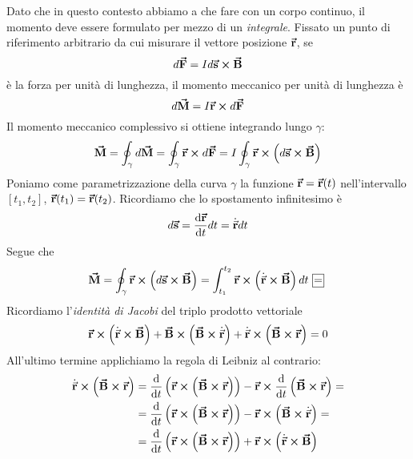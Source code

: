 \begin{demonstration}
	Dato che in questo contesto abbiamo a che fare con un corpo continuo, il momento deve essere formulato per mezzo di un \textit{integrale}. Fissato un punto di riferimento arbitrario da cui misurare il vettore posizione $\vb*{\va{r}}$, se
	\begin{equation*}
		d\vb*{\va{F}}=Id\vb*{\va{s}}\cross \vb*{\va{B}}
	\end{equation*}
	è la forza per unità di lunghezza, il momento meccanico per unità di lunghezza è
	\begin{equation*}
		d\vb*{\va{M}}=I\vb*{\va{r}}\cross d\vb*{\va{F}}
	\end{equation*}
	Il momento meccanico complessivo si ottiene integrando lungo $\gamma$:
	\begin{equation*}
		\vb*{\va{M}}=\oint_\gamma d\vb*{\va{M}}=\oint_\gamma \vb*{\va{r}}\cross d\vb*{\va{F}}=I \oint_\gamma \vb*{\va{r}}\cross\left(d\vb*{\va{s}}\cross\vb*{\va{B}}\right)
	\end{equation*}
		Poniamo come parametrizzazione della curva $\gamma$ la funzione $\vb*{\va{r}}=\vb*{\va{r}}(t)$ nell'intervallo $\left[t_1, t_2\right]$, $\vb*{\va{r}}(t_1)=\vb*{\va{r}}(t_2)$. Ricordiamo che lo spostamento infinitesimo è
	\begin{equation*}
		d\vb*{\va{s}}=\dv{\vb*{\va{r}}}{t}dt=\dot{\vec{\mathbf{r}}}dt
	\end{equation*}
	Segue che
	\begin{equation*}
		\vba{M}=\oint_\gamma \vba{r}\cross\left(d\vba{s}\cross\vba{B}\right)=\int_{t_1}^{t_2}\vba{r}\cross\left(\vbd{r}\cross\vba{B}\right)dt\squarequal
	\end{equation*}
	Ricordiamo l'\textit{identità di Jacobi} del triplo prodotto vettoriale
	\begin{equation*}
		\vb*{\va{r}}\cross\left(\dot{\vec{\mathbf{r}}}\cross\vb*{\va{B}}\right)+\vb*{\va{B}}\cross\left(\vb*{\va{B}}\cross\dot{\vec{\mathbf{r}}}\right)+\dot{\vec{\mathbf{r}}}\cross\left(\vb*{\va{B}}\cross\vb*{\va{r}}\right)=0
	\end{equation*}
	All'ultimo termine applichiamo la regola di Leibniz al contrario:
	\begin{align*}
		\dot{\vec{\mathbf{r}}}\cross\left(\vb*{\va{B}}\cross\vb*{\va{r}}\right)&=\dv{t}\left(\vb*{\va{r}}\cross\left(\vb*{\va{B}}\cross\vb*{\va{r}}\right)\right)-\vb*{\va{r}}\cross\dv{t}\left(\vb*{\va{B}}\cross\vb*{\va{r}}\right)=\\
		&=\dv{t}\left(\vb*{\va{r}}\cross\left(\vb*{\va{B}}\cross\vb*{\va{r}}\right)\right)-\vb*{\va{r}}\cross\left(\vb*{\va{B}}\cross \dot{\vec{\mathbf{r}}}\right)=\\
		&=\dv{t}\left(\vb*{\va{r}}\cross\left(\vb*{\va{B}}\cross\vb*{\va{r}}\right)\right)+\vb*{\va{r}}\cross\left(\dot{\vec{\mathbf{r}}}\cross\vb*{\va{B}}\right)
	\end{align*}

\end{demonstration}
